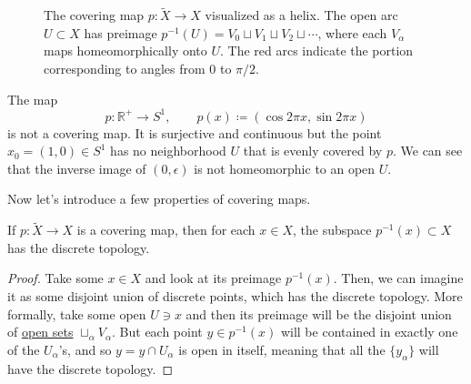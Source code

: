 \begin{example}
\begin{figure}[H]
			\caption{The covering map $p:\widetilde{X}\to X$ visualized as a helix. The open arc $U\subset X$ has preimage
			$p^{-1}(U)=V_0\sqcup V_1\sqcup V_2\sqcup \cdots$, where each $V_\alpha$ maps homeomorphically onto $U$. The red arcs indicate the portion corresponding to angles from $0$ to $\pi/2$.}
			\label{fig:helix_covering}
		\end{figure}
	\end{example}

  \begin{example}
    \label{ex:positive-reals-to-the-circle}
    The map 
    \begin{equation}
      p: \mathbb{R}^+ \to S^1, \qquad p(x) \coloneqq ( \cos{2 \pi x}, \sin{2\pi x}) 
    \end{equation}
    is not a covering map. It is surjective and continuous but the point $x_0 = (1, 0) \in S^1$ has no neighborhood $U$ that is evenly covered by $p$. We can see that the inverse image of $(0, \epsilon)$ is not homeomorphic to an open $U$. 
  \end{example}

	Now let's introduce a few properties of covering maps.

  \begin{lemma}
    \label{thm:preimage-of-singletons-have-discrete-topology}
    If $p: \widetilde{X} \to X$ is a covering map, then for each $x \in X$, the subspace $p^{-1} (x) \subset X$ has the discrete topology.
  \end{lemma}
  \begin{proof}
    Take some $x \in X$ and look at its preimage $p^{-1}(x)$. Then, we can imagine it as some disjoint union of discrete points, which has the discrete topology. More formally, take some open $U \ni x$ and then its preimage will be the disjoint union of \hyperref[pst-def:open-set]{open sets} $\sqcup_\alpha V_\alpha$. But each point $y \in p^{-1} (x)$ will be contained in exactly one of the $U_\alpha$'s, and so $y = y \cap U_\alpha$ is open in itself, meaning that all the $\{y_\alpha\}$ will have the discrete topology. 
  \end{proof} 

